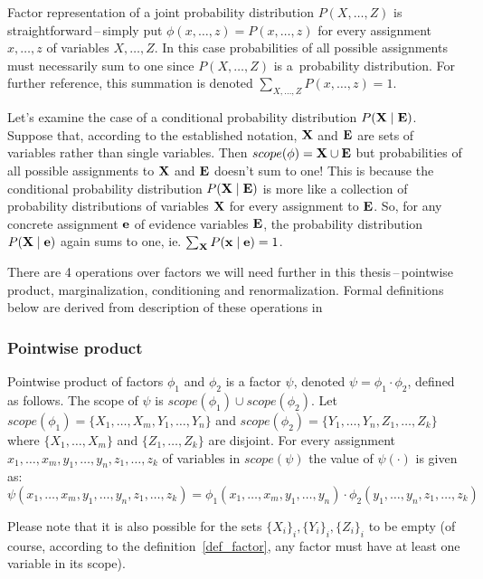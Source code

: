 \documentclass[english,cover]{fitthesis} %
\newcommand{\vars}[1]{{\bold{#1}}}         %
\begin{document}
Factor representation of a joint probability distribution $P(X,\dots,Z)$ is straightforward\,--\,simply put $\phi(x,\dots,z) = P(x,\dots,z)$ for every assignment $x,\dots,z$ of variables $X,\dots,Z$. In this case probabilities of all possible assignments must necessarily sum to one since $P(X,\dots,Z)$ is a~probability distribution. For further reference, this summation is denoted $\sum_{X,\dots,Z} P(x,\dots,z) = 1$.

Let's examine the case of a conditional probability distribution $P(\vars{X}\mid\vars{E})$. Suppose that, according to the established notation, $\vars{X}$ and $\vars{E}$ are sets of variables rather than single variables. Then $scope(\phi) = \vars{X} \cup \vars{E}$ but probabilities of all possible assignments to $\vars{X}$ and $\vars{E}$ doesn't sum to one! This is because the conditional probability distribution $P(\vars{X}\mid\vars{E})$ is more like a collection of probability distributions of variables $\vars{X}$ for every assignment to $\vars{E}$. So, for any concrete assignment $\vars{e}$ of evidence variables $\vars{E}$, the probability distribution $P(\vars{X}\mid\vars{e})$ again sums to one, ie. $\sum_\vars{X} P(\vars{x}\mid\vars{e}) = 1$.

\medskip
There are 4 operations over factors we will need further in this thesis\,--\,pointwise product, marginalization, conditioning and renormalization. Formal definitions below are derived from description of these operations in~\cite{russell_norvig_ed2, pgm}

\subsubsection{Pointwise product}
Pointwise product of factors $\phi_1$ and $\phi_2$ is a factor $\psi$, denoted $\psi = \phi_1 \cdot \phi_2$, defined as follows. The scope of $\psi$ is $scope(\phi_1) \cup scope(\phi_2)$. Let $scope(\phi_1) = \lbrace X_1, \dots, X_m, Y_1, \dots, Y_n \rbrace$ and $scope(\phi_2) = \lbrace Y_1, \dots, Y_n, Z_1, \dots, Z_k \rbrace$ where $\lbrace X_1, \dots, X_m \rbrace$ and $\lbrace Z_1, \dots, Z_k \rbrace$ are disjoint. For every assignment $x_1, \dots, x_m, y_1, \dots, y_n, z_1, \dots, z_k$ of variables in $scope(\psi)$ the value of $\psi(\cdot)$ is given as:
$$\psi(x_1, \dots, x_m, y_1, \dots, y_n, z_1, \dots, z_k)
= \phi_1(x_1, \dots, x_m, y_1, \dots, y_n) \cdot \phi_2(y_1, \dots, y_n, z_1, \dots, z_k)
$$

Please note that it is also possible for the sets $\lbrace X_i \rbrace_i, \lbrace Y_i \rbrace_i,\lbrace Z_i \rbrace_i$ to be empty (of course, according to the definition~\ref{def_factor}, any factor must have at least one variable in its scope).
\end{document}
